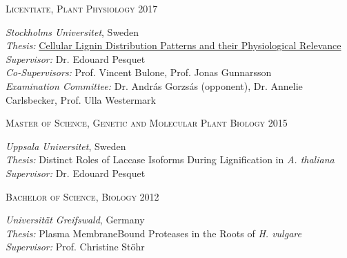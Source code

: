 \documentclass[11pt]{article}
\begin{document}
\begin{addmargin}[15pt]{0pt}
\textsc{\large{Licentiate, Plant Physiology} \hfill \textsc{2017}}
\end{addmargin}
\begin{addmargin}[24pt]{0pt}
	\textit{Stockholms Universitet}, Sweden \\
	\textit{Thesis:} \href{https://urn.kb.se/resolve?urn=urn:nbn:se:su:diva-177863}{Cellular Lignin Distribution Patterns and their Physiological Relevance} \\
	\textit{Supervisor:} Dr. Edouard Pesquet \\
	\textit{Co-Supervisors:} Prof. Vincent Bulone, Prof. Jonas Gunnarsson\\
	\textit{Examination Committee:} Dr. András Gorzsás (opponent), Dr. Annelie Carlsbecker, Prof. Ulla Westermark
\end{addmargin}
\vspace{0.2cm}

\begin{addmargin}[15pt]{0pt}
\textsc{\large{Master of Science, Genetic and Molecular Plant Biology} \hfill \textsc{2015}}
\end{addmargin}
\begin{addmargin}[24pt]{0pt}
	\textit{Uppsala Universitet}, Sweden \\
	\textit{Thesis:} Distinct Roles of Laccase Isoforms During Lignification in \textit{ A. thaliana}\\
	\textit{Supervisor:} Dr. Edouard Pesquet
\end{addmargin}
\vspace{0.2cm}

\begin{addmargin}[15pt]{0pt}
\textsc{\large{Bachelor of Science, Biology} \hfill \textsc{2012}}
\end{addmargin}
\begin{addmargin}[24pt]{0pt}
	\textit{Universität Greifswald}, Germany \\
	\textit{Thesis:} Plasma Membrane\textendash Bound Proteases in the Roots of \textit{H. vulgare}\\
	\textit{Supervisor:} Prof. Christine Stöhr
\end{addmargin}
\vspace{0.5cm}

\newpage


\end{document}
